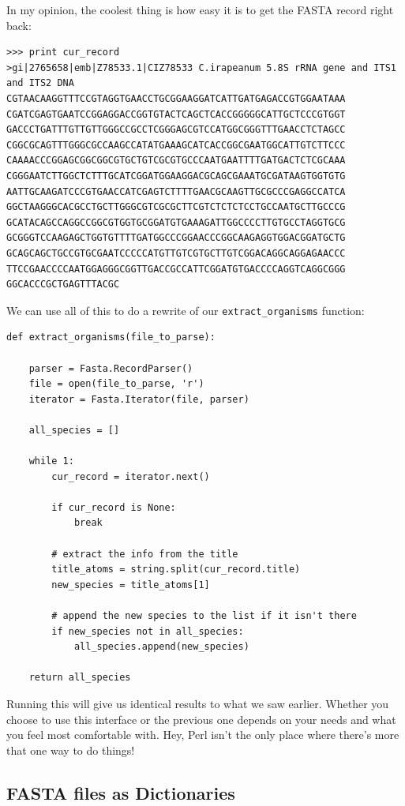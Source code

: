 \documentclass{report}
\begin{document}
In my opinion, the coolest thing is how easy it is to get the FASTA record right back:

\begin{verbatim}
>>> print cur_record
>gi|2765658|emb|Z78533.1|CIZ78533 C.irapeanum 5.8S rRNA gene and ITS1 and ITS2 DNA
CGTAACAAGGTTTCCGTAGGTGAACCTGCGGAAGGATCATTGATGAGACCGTGGAATAAA
CGATCGAGTGAATCCGGAGGACCGGTGTACTCAGCTCACCGGGGGCATTGCTCCCGTGGT
GACCCTGATTTGTTGTTGGGCCGCCTCGGGAGCGTCCATGGCGGGTTTGAACCTCTAGCC
CGGCGCAGTTTGGGCGCCAAGCCATATGAAAGCATCACCGGCGAATGGCATTGTCTTCCC
CAAAACCCGGAGCGGCGGCGTGCTGTCGCGTGCCCAATGAATTTTGATGACTCTCGCAAA
CGGGAATCTTGGCTCTTTGCATCGGATGGAAGGACGCAGCGAAATGCGATAAGTGGTGTG
AATTGCAAGATCCCGTGAACCATCGAGTCTTTTGAACGCAAGTTGCGCCCGAGGCCATCA
GGCTAAGGGCACGCCTGCTTGGGCGTCGCGCTTCGTCTCTCTCCTGCCAATGCTTGCCCG
GCATACAGCCAGGCCGGCGTGGTGCGGATGTGAAAGATTGGCCCCTTGTGCCTAGGTGCG
GCGGGTCCAAGAGCTGGTGTTTTGATGGCCCGGAACCCGGCAAGAGGTGGACGGATGCTG
GCAGCAGCTGCCGTGCGAATCCCCCATGTTGTCGTGCTTGTCGGACAGGCAGGAGAACCC
TTCCGAACCCCAATGGAGGGCGGTTGACCGCCATTCGGATGTGACCCCAGGTCAGGCGGG
GGCACCCGCTGAGTTTACGC
\end{verbatim}

We can use all of this to do a rewrite of our \verb|extract_organisms| function:

\begin{verbatim}
def extract_organisms(file_to_parse):

    parser = Fasta.RecordParser()
    file = open(file_to_parse, 'r')
    iterator = Fasta.Iterator(file, parser)

    all_species = []

    while 1:
        cur_record = iterator.next()

        if cur_record is None:
            break

        # extract the info from the title
        title_atoms = string.split(cur_record.title)
        new_species = title_atoms[1]

        # append the new species to the list if it isn't there
        if new_species not in all_species:
            all_species.append(new_species)

    return all_species
\end{verbatim}

Running this will give us identical results to what we saw earlier. Whether you choose to use this interface or the previous one depends on your needs and what you feel most comfortable with. Hey, Perl isn't the only place where there's more that one way to do things!

\subsection{FASTA files as Dictionaries}
\end{document}
